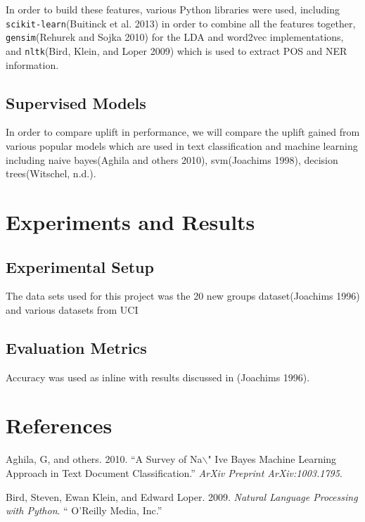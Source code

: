 In order to build these features, various Python libraries were used,
including \texttt{scikit-learn}(Buitinck et al. 2013) in order to
combine all the features together, \texttt{gensim}(Rehurek and Sojka
2010) for the LDA and word2vec implementations, and \texttt{nltk}(Bird,
Klein, and Loper 2009) which is used to extract POS and NER information.

\subsection{Supervised Models}\label{supervised-models}

In order to compare uplift in performance, we will compare the uplift
gained from various popular models which are used in text classification
and machine learning including naive bayes(Aghila and others 2010),
svm(Joachims 1998), decision trees(Witschel, n.d.).

\section{Experiments and Results}\label{experiments-and-results}

\subsection{Experimental Setup}\label{experimental-setup}

The data sets used for this project was the 20 new groups
dataset(Joachims 1996) and various datasets from UCI

\subsection{Evaluation Metrics}\label{evaluation-metrics}

Accuracy was used as inline with results discussed in (Joachims 1996).

\section*{References}\label{references}

\hypertarget{refs}{}
\hypertarget{ref-aghila2010survey}{}
Aghila, G, and others. 2010. ``A Survey of Na\(\backslash\)" Ive Bayes
Machine Learning Approach in Text Document Classification.'' \emph{ArXiv
Preprint ArXiv:1003.1795}.

\hypertarget{ref-bird2009natural}{}
Bird, Steven, Ewan Klein, and Edward Loper. 2009. \emph{Natural Language
Processing with Python}. `` O'Reilly Media, Inc.''

